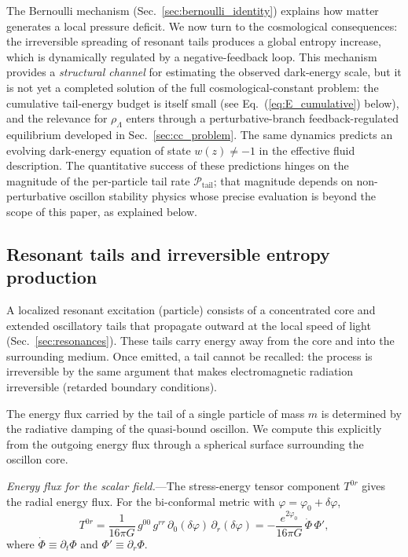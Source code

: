 \documentclass[aps,prd,onecolumn,superscriptaddress,nofootinbib,showpacs,12pt,notitlepage]{revtex4-2}
\begin{document}
The Bernoulli mechanism (Sec.~\ref{sec:bernoulli_identity}) explains how
matter generates a local pressure deficit.  We now turn to the
cosmological consequences: the irreversible spreading of resonant
tails produces a global entropy increase, which is dynamically
regulated by a negative-feedback loop.  This mechanism provides a
\emph{structural channel} for estimating the observed dark-energy
scale, but it is not yet a completed solution of the full
cosmological-constant problem: the cumulative tail-energy budget is
itself small (see Eq.~(\ref{eq:E_cumulative}) below), and the
relevance for $\rho_{\Lambda}$ enters through a
perturbative-branch feedback-regulated equilibrium developed in
Sec.~\ref{sec:cc_problem}.  The same dynamics predicts an evolving
dark-energy equation of state $w(z) \neq -1$ in the effective
fluid description.  The quantitative success of these predictions
hinges on the magnitude of the per-particle tail rate
$\mathcal{P}_{\mathrm{tail}}$; that magnitude depends on
non-perturbative oscillon stability physics whose precise
evaluation is beyond the scope of this paper, as explained below.

\subsection{Resonant tails and irreversible entropy production}
\label{sec:entropy_mech}

A localized resonant excitation (particle) consists of a concentrated
core and extended oscillatory tails that propagate outward at the
local speed of light (Sec.~\ref{sec:resonances}).  These tails carry
energy away from the core and into the surrounding medium.  Once
emitted, a tail cannot be recalled: the process is irreversible
by the same argument that makes electromagnetic radiation irreversible
(retarded boundary conditions).

The energy flux carried by the tail of a single particle of mass $m$
is determined by the radiative damping of the quasi-bound oscillon.
We compute this explicitly from the outgoing energy flux through a
spherical surface surrounding the oscillon core.

\textit{Energy flux for the scalar field.}---The stress-energy
tensor component $T^{0r}$ gives the radial energy flux.  For
the bi-conformal metric with $\varphi = \varphi_0 + \delta\varphi$,
\begin{equation}\label{eq:T_0r}
  T^{0r} = \frac{1}{16\pi G}\, g^{00}\,g^{rr}\,
    \partial_0(\delta\varphi)\,\partial_r(\delta\varphi)
  = -\frac{e^{2\varphi_0}}{16\pi G}\,
    \dot{\Phi}\,\Phi',
\end{equation}
where $\dot{\Phi} \equiv \partial_t\Phi$ and $\Phi' \equiv \partial_r\Phi$.
\end{document}
